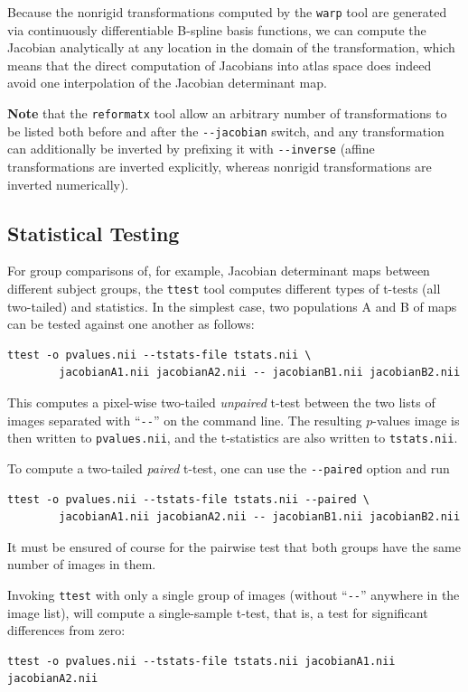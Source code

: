 \documentclass{InsightArticle}
\begin{document}
Because the nonrigid transformations computed by the \verb|warp| tool are
generated via continuously differentiable B-spline basis functions, we can
compute the Jacobian analytically at any location in the domain of the
transformation, which means that the direct computation of Jacobians into
atlas space does indeed avoid one interpolation of the Jacobian determinant
map.

{\bf Note} that the \verb|reformatx| tool allow an arbitrary number of
transformations to be listed both before and after the \verb|--jacobian|
switch, and any transformation can additionally be inverted by prefixing it
with \verb|--inverse| (affine transformations are inverted explicitly, whereas
nonrigid transformations are inverted numerically). 

\subsection{Statistical Testing}

For group comparisons of, for example, Jacobian determinant maps between
different subject groups, the \verb|ttest| tool computes different types of
t-tests (all two-tailed) and statistics. In the simplest case, two populations
A and B of maps can be tested against one another as follows:
\begin{verbatim}
ttest -o pvalues.nii --tstats-file tstats.nii \
        jacobianA1.nii jacobianA2.nii -- jacobianB1.nii jacobianB2.nii
\end{verbatim} 
This computes a pixel-wise two-tailed {\em unpaired\/} t-test between the two
lists of images separated with ``\verb|--|'' on the command line. The
resulting $p$-values image is then written to \verb|pvalues.nii|, and the
t-statistics are also written to \verb|tstats.nii|.

To compute a two-tailed {\em paired\/} t-test, one can use the \verb|--paired|
option and run
\begin{verbatim}
ttest -o pvalues.nii --tstats-file tstats.nii --paired \
        jacobianA1.nii jacobianA2.nii -- jacobianB1.nii jacobianB2.nii
\end{verbatim}
It must be ensured of course for the pairwise test that both groups have the
same number of images in them.

Invoking \verb|ttest| with only a single group of images (without
``\verb|--|'' anywhere in the image list), will compute a single-sample
t-test, that is, a test for significant differences from zero:
\begin{verbatim}
ttest -o pvalues.nii --tstats-file tstats.nii jacobianA1.nii jacobianA2.nii
\end{verbatim} 
\end{document}
